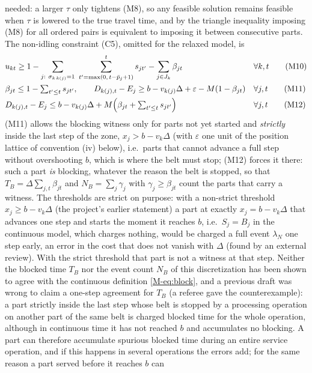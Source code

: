 \documentclass[11pt,a4paper]{article}
\theoremstyle{plain}
\theoremstyle{definition}
\theoremstyle{remark}
\begin{document}
needed: a larger $\tau$ only tightens (M8), so any feasible solution remains feasible when
$\tau$ is lowered to the true travel time, and by the triangle inequality imposing (M8)
for all ordered pairs is equivalent to imposing it between consecutive parts. The
non-idling constraint (C5), omitted for the relaxed model, is
\begin{align}
&u_{kt}\ge 1-\sum_{j:\ \sigma_{k\,k(j)}=1}\ \sum_{t'=\max(0,\,t-\bar p_j+1)}^{t}s_{jt'}-\sum_{j\in J_k}\beta_{jt} && \forall k,t \tag{M10}\\
&\beta_{jt}\le 1-\textstyle\sum_{t'\le t}s_{jt'},\qquad
 D_{k(j),t}-E_j\ge b-v_{k(j)}\Delta+\varepsilon-M(1-\beta_{jt}) && \forall j,t \tag{M11}\\
&D_{k(j),t}-E_j\le b-v_{k(j)}\Delta+M\Bigl(\beta_{jt}+\textstyle\sum_{t'\le t}s_{jt'}\Bigr) && \forall j,t \tag{M12}
\end{align}
(M11) allows the blocking witness only for parts not yet started and \emph{strictly}
inside the last step of the zone, $x_j>b-v_k\Delta$ (with $\varepsilon$ one unit of the
position lattice of convention (iv) below), i.e.\ parts that cannot advance a full step without
overshooting $b$, which is where the belt must stop; (M12) forces it there: such a part
\emph{is} blocking, whatever the reason the belt is stopped, so that
$T_B=\Delta\sum_{j,t}\beta_{jt}$ and $N_B=\sum_j\gamma_j$ with $\gamma_j\ge\beta_{jt}$
count the parts that carry a witness. The
thresholds are strict on purpose: with a non-strict threshold $x_j\ge b-v_k\Delta$ (the
project's earlier statement) a part at exactly $x_j=b-v_k\Delta$ that advances one step
and starts the moment it reaches $b$, i.e.\ $S_j=B_j$ in the continuous model, which
charges nothing, would be charged a full event $\lambda_N$ one step early, an error in
the cost that does not vanish with $\Delta$ (found by an external review). With the
strict threshold that part is not a witness at that step. Neither the blocked time $T_B$
nor the event count $N_B$ of this discretization has been shown to agree with the
continuous definition \eqref{M-eq:block}, and a previous draft was wrong to claim a
one-step agreement for $T_B$ (a referee gave the counterexample): a part strictly inside
the last step whose belt is stopped by a processing operation on another part of the
same belt is charged blocked time for the whole operation, although in continuous time
it has not reached $b$ and accumulates no blocking. A part can therefore accumulate
spurious blocked time during an entire service operation, and if this happens in several
operations the errors add; for the same reason a part served before it reaches $b$ can
\end{document}
